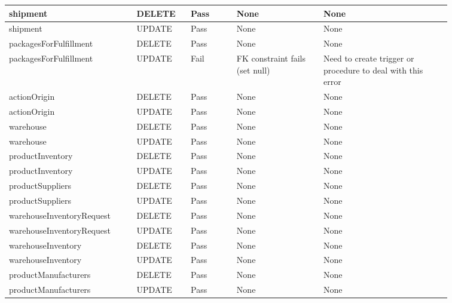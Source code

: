 \begin{spacing}{1.25}
\begin{longtable}{ | p{0.25\linewidth} | p{0.1\linewidth} | p{0.09\linewidth} | p{0.17\linewidth} | p{0.25\linewidth} | }
shipment					&	DELETE		&	Pass		&	None							&	None				\\\hline
shipment					&	UPDATE		&	Pass		&	None							&	None				\\\hline
packagesForFulfillment		&	DELETE		&	Pass		&	None							&	None				\\\hline
packagesForFulfillment		&	UPDATE		&	Fail		&	FK constraint fails (set null)	&	Need to create trigger or procedure to deal with this error\\\hline
actionOrigin				&	DELETE		&	Pass		&	None							&	None				\\\hline
actionOrigin				&	UPDATE		&	Pass		&	None							&	None				\\\hline
warehouse					&	DELETE		&	Pass		&	None							&	None				\\\hline
warehouse					&	UPDATE		&	Pass		&	None							&	None				\\\hline
productInventory			&	DELETE		&	Pass		&	None							&	None				\\\hline
productInventory			&	UPDATE		&	Pass		&	None							&	None				\\\hline
productSuppliers			&	DELETE		&	Pass		&	None							&	None				\\\hline
productSuppliers			&	UPDATE		&	Pass		&	None							&	None				\\\hline
warehouseInventoryRequest	&	DELETE		&	Pass		&	None							&	None				\\\hline
warehouseInventoryRequest	&	UPDATE		&	Pass		&	None							&	None				\\\hline
warehouseInventory			&	DELETE		&	Pass		&	None							&	None				\\\hline
warehouseInventory			&	UPDATE		&	Pass		&	None							&	None				\\\hline
productManufacturers		&	DELETE		&	Pass		&	None							&	None				\\\hline
productManufacturers		&	UPDATE		&	Pass		&	None							&	None				\\\hline
\end{longtable}
\end{spacing}